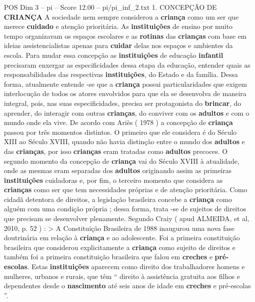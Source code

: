 \begin{textsample}{POS Dim 3 – pi – Score 12.00 – pi/pi\_inf\_2.txt}  \label{ex:f3_pos_259}
1.
CONCEPÇÃO DE \textbf{CRIANÇA} A sociedade nem sempre considerou a \textbf{criança} como um ser que merece \textbf{cuidado} e atenção prioritária.
As \textbf{instituições} de ensino por muito tempo organizavam os espaços escolares e as \textbf{rotinas} das \textbf{crianças} com base em ideias assistencialistas apenas para \textbf{cuidar} delas nos espaços e ambientes da escola.
Para mudar essa concepção as \textbf{instituições} de educação \textbf{infantil} precisaram enxergar as especificidades dessa etapa da educação, entender quais as responsabilidades das respectivas \textbf{instituições}, do Estado e da família.
Dessa forma, atualmente entende -se que a \textbf{criança} possui particularidades que exigem interlocução de todos os atores envolvidos para que ela se desenvolva de maneira integral, pois, nas suas especificidades, precisa ser protagonista do \textbf{brincar}, do aprender, do interagir com outras \textbf{crianças}, do conviver com os \textbf{adultos} e com o mundo onde ela vive.
De acordo com Ariès ( 1978 ) a concepção de \textbf{criança} passou por três momentos distintos.
O primeiro que ele considera é do Século XIII ao Século XVIII, quando não havia distinção entre o mundo dos \textbf{adultos} e das \textbf{crianças}, por isso \textbf{crianças} eram tratadas como \textbf{adultos} precoces.
O segundo momento da concepção de \textbf{criança} vai do Século XVIII à atualidade, onde as mesmas eram separadas dos \textbf{adultos} originando assim as primeiras \textbf{instituições} cuidadoras e, por fim, o terceiro momento que considera as \textbf{crianças} como ser que tem necessidades próprias e de atenção prioritária.
Como cidadã detentora de direitos, a legislação brasileira concebe a \textbf{criança} como alguém com uma condição própria ; dessa forma, trata -se de sujeitos de direitos que precisam se desenvolver plenamente.
Segundo Craiy ( apud ALMEIDA, et al, 2010, p. 52 ) : > A Constituição Brasileira de 1988 inaugurou uma nova fase doutrinária em relação à \textbf{criança} e ao adolescente.
Foi a primeira constituição brasileira que considerou explicitamente a \textbf{criança} como sujeito de direitos e também foi a primeira constituição brasileira que falou em \textbf{creches} e \textbf{pré-escolas}.
Estas \textbf{instituições} aparecem como direito dos trabalhadores homens e mulheres, urbanos e rurais, que têm “ direito à assistência gratuita aos filhos e dependentes desde o \textbf{nascimento} até seis anos de idade em \textbf{creches} e pré-escolas ”.

\end{textsample}
